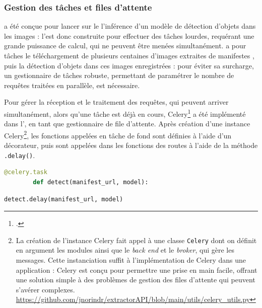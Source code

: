 	\subsubsection{Gestion des tâches et files d'attente}
	\exapi a été conçue pour lancer sur le \gpu l'inférence d'un modèle de détection d'objets dans les images : l'\api est donc construite pour effectuer des tâches lourdes, requérant une grande puissance de calcul, qui ne peuvent être menées simultanément. \exapi a pour tâches le téléchargement de plusieurs centaines d'images extraites de manifestes \iiif, puis la détection d'objets dans ces images enregistrées : pour éviter sa surcharge, un gestionnaire de tâches robuste, permettant de paramétrer le nombre de requêtes traitées en parallèle, est nécessaire.
	
	Pour gérer la réception et le traitement des requêtes, qui peuvent arriver simultanément, alors qu'une tâche est déjà en cours, Celery\footcite{CeleryDistributedTask} a été implémenté dans l'\api, en tant que gestionnaire de file d'attente. Après création d'une instance Celery\footnote{La création de l'instance Celery fait appel à une classe \texttt{Celery} dont on définit en argument les modules ainsi que le \textit{back end} et le \textit{broker}, qui gère les messages. Cette instanciation suffit à l'implémentation de Celery dans une application : Celery est conçu pour permettre une prise en main facile, offrant une solution simple à des problèmes de gestion des files d'attente qui peuvent s'avérer complexes. \url{https://github.com/jnorindr/extractorAPI/blob/main/utils/celery_utils.py}}, les fonctions appelées en tâche de fond sont définies à l'aide d'un décorateur, puis sont appelées dans les fonctions des routes à l'aide de la méthode \texttt{.delay()}.
	
	\begin{lstlisting}[language=Python]
		@celery.task
		def detect(manifest_url, model):\end{lstlisting}
	
	\begin{lstlisting}[language=Python]
		detect.delay(manifest_url, model)\end{lstlisting}
	
